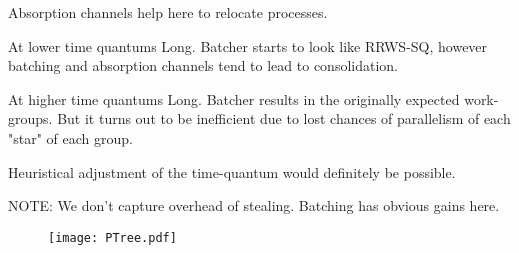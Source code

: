 \begin{slide}
{        \item Absorption channels help here to relocate processes.

        \item At lower time quantums Long. Batcher starts to look like RRWS-SQ, 
            however batching and absorption channels tend to lead to consolidation.

        \item At higher time quantums Long. Batcher results in the originally expected
            work-groups. But it turns out to be inefficient due to lost chances of
            parallelism of each "star" of each group.

        \item Heuristical adjustment of the time-quantum would definitely be possible.

        \item NOTE: We don't capture overhead of stealing. Batching has obvious gains here.
    }
\end{slide}

\begin{slide} %
    \begin{figure}
        \centering
        \texttt{[image: PTree.pdf]}
    \end{figure}
\end{slide}

